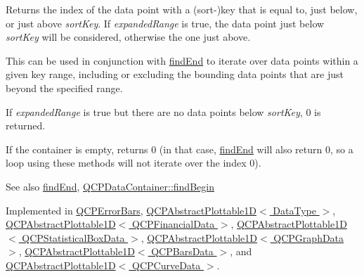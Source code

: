 Returns the index of the data point with a (sort-\/)key that is equal to, just below, or just above {\itshape sort\+Key}. If {\itshape expanded\+Range} is true, the data point just below {\itshape sort\+Key} will be considered, otherwise the one just above.

This can be used in conjunction with \hyperlink{classQCPPlottableInterface1D_a5deced1016bc55a41a2339619045b295}{find\+End} to iterate over data points within a given key range, including or excluding the bounding data points that are just beyond the specified range.

If {\itshape expanded\+Range} is true but there are no data points below {\itshape sort\+Key}, 0 is returned.

If the container is empty, returns 0 (in that case, \hyperlink{classQCPPlottableInterface1D_a5deced1016bc55a41a2339619045b295}{find\+End} will also return 0, so a loop using these methods will not iterate over the index 0).

\begin{DoxySeeAlso}{See also}
\hyperlink{classQCPPlottableInterface1D_a5deced1016bc55a41a2339619045b295}{find\+End}, \hyperlink{classQCPDataContainer_a2ad8a5399072d99a242d3a6d2d7e278a}{Q\+C\+P\+Data\+Container\+::find\+Begin} 
\end{DoxySeeAlso}


Implemented in \hyperlink{classQCPErrorBars_a74c57d6abb8eda3c4c31b72d1df9f568}{Q\+C\+P\+Error\+Bars}, \hyperlink{classQCPAbstractPlottable1D_ad0b46d25cde3d035b180fb8f10c056e6}{Q\+C\+P\+Abstract\+Plottable1\+D$<$ Data\+Type $>$}, \hyperlink{classQCPAbstractPlottable1D_ad0b46d25cde3d035b180fb8f10c056e6}{Q\+C\+P\+Abstract\+Plottable1\+D$<$ Q\+C\+P\+Financial\+Data $>$}, \hyperlink{classQCPAbstractPlottable1D_ad0b46d25cde3d035b180fb8f10c056e6}{Q\+C\+P\+Abstract\+Plottable1\+D$<$ Q\+C\+P\+Statistical\+Box\+Data $>$}, \hyperlink{classQCPAbstractPlottable1D_ad0b46d25cde3d035b180fb8f10c056e6}{Q\+C\+P\+Abstract\+Plottable1\+D$<$ Q\+C\+P\+Graph\+Data $>$}, \hyperlink{classQCPAbstractPlottable1D_ad0b46d25cde3d035b180fb8f10c056e6}{Q\+C\+P\+Abstract\+Plottable1\+D$<$ Q\+C\+P\+Bars\+Data $>$}, and \hyperlink{classQCPAbstractPlottable1D_ad0b46d25cde3d035b180fb8f10c056e6}{Q\+C\+P\+Abstract\+Plottable1\+D$<$ Q\+C\+P\+Curve\+Data $>$}.

\mbox{\label{classQCPPlottableInterface1D_a5deced1016bc55a41a2339619045b295}} 
